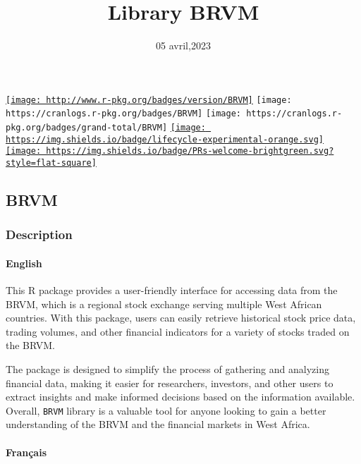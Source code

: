\documentclass[
]{article}
\title{Library BRVM}
\author{}
\date{\vspace{-2.5em}05 avril,2023}
\begin{document}
\maketitle

{
\setcounter{tocdepth}{2}
\tableofcontents
}
\href{https://cran.r-project.org/package=BRVM}{\texttt{[image: http://www.r-pkg.org/badges/version/BRVM]}}
\texttt{[image: https://cranlogs.r-pkg.org/badges/BRVM]}
\texttt{[image: https://cranlogs.r-pkg.org/badges/grand-total/BRVM]}
\href{https://lifecycle.r-lib.org/articles/stages.html\#\#experimental}{\texttt{[image: https://img.shields.io/badge/lifecycle-experimental-orange.svg]}}
\href{https://makeapullrequest.com}{\texttt{[image: https://img.shields.io/badge/PRs-welcome-brightgreen.svg?style=flat-square]}}

\hypertarget{brvm}{%
\subsection{BRVM}\label{brvm}}

\hypertarget{description}{%
\subsubsection{Description}\label{description}}

\hypertarget{english}{%
\paragraph{English}\label{english}}

This R package provides a user-friendly interface for accessing data
from the BRVM, which is a regional stock exchange serving multiple West
African countries. With this package, users can easily retrieve
historical stock price data, trading volumes, and other financial
indicators for a variety of stocks traded on the BRVM.

The package is designed to simplify the process of gathering and
analyzing financial data, making it easier for researchers, investors,
and other users to extract insights and make informed decisions based on
the information available. Overall, \texttt{BRVM} library is a valuable
tool for anyone looking to gain a better understanding of the BRVM and
the financial markets in West Africa.

\hypertarget{franuxe7ais}{%
\paragraph{Français}\label{franuxe7ais}}
\end{document}
